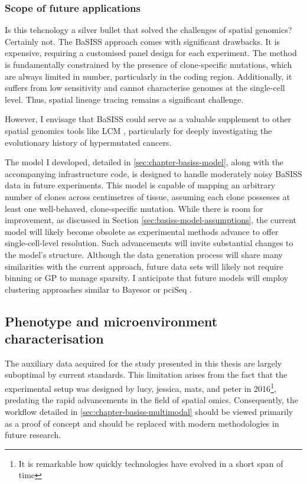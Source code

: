\subsubsection*{Scope of future applications}

Is this tehcnology a silver bullet that solved the challenges of spatial genomics? Certainly not. The \ac{BaSISS} approach comes with significant drawbacks. It is expensive, requiring a customised panel design for each experiment. The method is fundamentally constrained by the presence of clone-specific mutations, which are always limited in number, particularly in the coding region. Additionally, it suffers from low sensitivity and cannot characterise genomes at the single-cell level. Thus, spatial lineage tracing remains a significant challenge.

However, I envisage that \ac{BaSISS} could serve as a valuable supplement to other spatial genomics tools like \ac{LCM} , particularly for deeply investigating the evolutionary history of hypermutated cancers.

The model I developed, detailed in \cref{sec:chapter-basiss-model}, along with the accompanying infrastructure code, is designed to handle moderately noisy \ac{BaSISS} data in future experiments. This model is capable of mapping an arbitrary number of clones across centimetres of tissue, assuming each clone possesses at least one well-behaved, clone-specific mutation. While there is room for improvement, as discussed in Section \cref{sec:basiss-model-assumptions}, the current model will likely become obsolete as experimental methods advance to offer single-cell-level resolution. Such advancements will invite substantial changes to the model's structure. Although the data generation process will share many similarities with the current approach, future data sets will likely not require binning or \ac{GP} to manage sparsity. I anticipate that future models will employ clustering approaches similar to Bayesor \parencite{Petukhov2022-pv} or pciSeq \parencite{Qian2020-mp}.

\subsection{Phenotype and microenvironment characterisation}

The auxiliary data acquired for the study presented in this thesis are largely suboptimal by current standards. This limitation arises from the fact that the experimental setup was designed by \ac{lucy}, \ac{jessica}, \ac{mats}, and \ac{peter} in 2016\footnote{It is remarkable how quickly technologies have evolved in a short span of time}, predating the rapid advancements in the field of spatial omics. Consequently, the workflow detailed in \cref{sec:chapter-basiss-multimodal} should be viewed primarily as a proof of concept and should be replaced with modern methodologies in future research.

